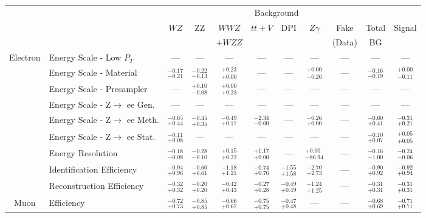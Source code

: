 \small\renewcommand{\tabcolsep}{1pt}
\begin{tabular}{|cl||ccccccc|c||c|}
\hline
 & & \multicolumn{8}{c||}{Background} & \\ 
 & & $WZ$ & ZZ & $WWZ$ & $t\overline{t}+V$ & DPI & $Z\gamma$ & Fake & Total & Signal\\ 
 & & &  & $+WZZ$ &  &  &  & (Data) & BG & \\ 
\hline\hline
\multirow{9}{*}{Electron}
&Energy Scale - Low $P_{T}$ & --- & --- & --- & --- & --- & --- & --- & --- & ---\\ 
\cline{2-11}
&Energy Scale - Material &  $^{-0.17}_{-0.21}$  &  $^{-0.22}_{-0.13}$  &  $^{+0.23}_{+0.00}$  & --- & --- &  $^{+0.00}_{-0.26}$  & --- &  $^{-0.16}_{-0.19}$  &  $^{+0.00}_{-0.11}$ \\ 
\cline{2-11}
&Energy Scale - Presampler & --- &  $^{+0.10}_{-0.08}$  &  $^{+0.00}_{+0.23}$  & --- & --- & --- & --- & --- & ---\\ 
\cline{2-11}
&Energy Scale - Z$\rightarrow$ ee Gen. & --- & --- & --- & --- & --- & --- & --- & --- & ---\\ 
\cline{2-11}
&Energy Scale - Z$\rightarrow$ ee Meth. &  $^{-0.65}_{+0.44}$  &  $^{-0.45}_{+0.35}$  &  $^{-0.49}_{+0.17}$  &  $^{-2.34}_{-0.00}$  & --- &  $^{-0.26}_{+0.00}$  & --- &  $^{-0.60}_{+0.41}$  &  $^{-0.31}_{+0.21}$ \\ 
\cline{2-11}
&Energy Scale - Z$\rightarrow$ ee Stat. &  $^{-0.11}_{+0.08}$  & --- & --- & --- & --- & --- & --- &  $^{-0.10}_{+0.07}$  &  $^{+0.05}_{+0.05}$ \\ 
\cline{2-11}
&Energy Resolution &  $^{-0.18}_{-0.08}$  &  $^{-0.28}_{-0.10}$  &  $^{+0.15}_{+0.22}$  &  $^{+1.17}_{+0.00}$  & --- &  $^{+0.00}_{-86.94}$  & --- &  $^{-0.16}_{-1.00}$  &  $^{-0.24}_{-0.06}$ \\ 
\cline{2-11}
&Identification Efficiency &  $^{-0.94}_{+0.96}$  &  $^{-0.60}_{+0.61}$  &  $^{-1.18}_{+1.21}$  &  $^{-0.74}_{+0.76}$  &  $^{-1.55}_{+1.58}$  &  $^{-2.70}_{+2.73}$  & --- &  $^{-0.90}_{+0.92}$  &  $^{-0.92}_{+0.94}$ \\ 
\cline{2-11}
&Reconstruction Efficiency &  $^{-0.32}_{+0.32}$  &  $^{-0.20}_{+0.20}$  &  $^{-0.42}_{+0.43}$  &  $^{-0.27}_{+0.28}$  &  $^{-0.49}_{+0.49}$  &  $^{-1.24}_{+1.25}$  & --- &  $^{-0.31}_{+0.31}$  &  $^{-0.31}_{+0.31}$ \\ 
\hline
\multirow{4}{*}{Muon}
&Efficiency &  $^{-0.72}_{+0.73}$  &  $^{-0.85}_{+0.85}$  &  $^{-0.66}_{+0.67}$  &  $^{-0.75}_{+0.75}$  &  $^{-0.47}_{+0.48}$  & --- & --- &  $^{-0.68}_{+0.69}$  &  $^{-0.71}_{+0.71}$ \\ 

\end{tabular}
